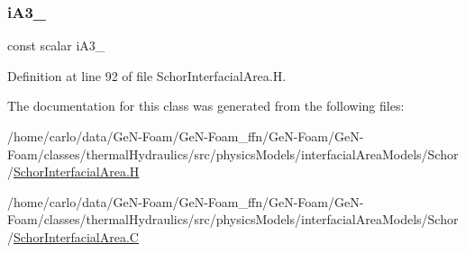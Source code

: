 \subsubsection{\texorpdfstring{i\+A3\+\_\+}{iA3\_}}
{\footnotesize\ttfamily const scalar i\+A3\+\_\+\hspace{0.3cm}{\ttfamily [protected]}}



Definition at line 92 of file Schor\+Interfacial\+Area.\+H.



The documentation for this class was generated from the following files\+:\begin{DoxyCompactItemize}
\item 
/home/carlo/data/\+Ge\+N-\/\+Foam/\+Ge\+N-\/\+Foam\+\_\+ffn/\+Ge\+N-\/\+Foam/\+Ge\+N-\/\+Foam/classes/thermal\+Hydraulics/src/physics\+Models/interfacial\+Area\+Models/\+Schor/\hyperlink{SchorInterfacialArea_8H}{Schor\+Interfacial\+Area.\+H}\item 
/home/carlo/data/\+Ge\+N-\/\+Foam/\+Ge\+N-\/\+Foam\+\_\+ffn/\+Ge\+N-\/\+Foam/\+Ge\+N-\/\+Foam/classes/thermal\+Hydraulics/src/physics\+Models/interfacial\+Area\+Models/\+Schor/\hyperlink{SchorInterfacialArea_8C}{Schor\+Interfacial\+Area.\+C}\end{DoxyCompactItemize}
